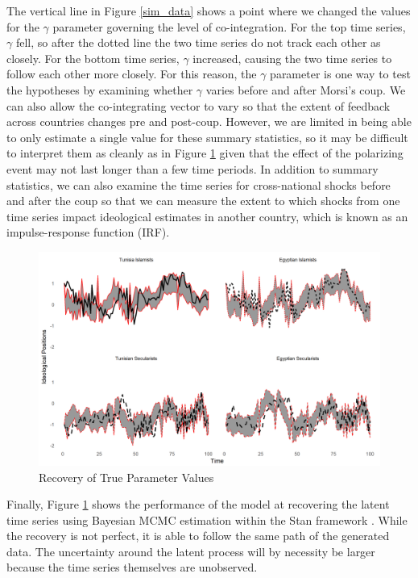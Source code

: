 \documentclass[12pt]{article}
\begin{document}
The vertical line in Figure \ref{sim_data} shows a point where we changed the values for the $\gamma$ parameter governing the level of co-integration. For the top time series, $\gamma$ fell, so after the dotted line the two time series do not track each other as closely. For the bottom time series, $\gamma$ increased, causing the two time series to follow each other more closely. For this reason, the $\gamma$ parameter is one way to test the hypotheses by examining whether $\gamma$ varies before and after Morsi's coup. We can also allow the co-integrating vector to vary so that the extent of feedback across countries changes pre and post-coup. However, we are limited in being able to only estimate a single value for these summary statistics, so it may be difficult to interpret them as cleanly as in Figure \ref*{true_pars} given that the effect of the polarizing event may not last longer than a few time periods. In addition to summary statistics, we can also examine the time series for cross-national shocks before and after the coup so that we can measure the extent to which shocks from one time series impact ideological estimates in another country, which is known as an impulse-response function (IRF).
\begin{figure}[!h]
	\caption{Recovery of True Parameter Values}\label{true_pars}
	\centering
	\includegraphics[width=.9\linewidth]{true_estimated.png}
\end{figure}

Finally, Figure \ref{true_pars} shows the performance of the model at recovering the latent time series using Bayesian MCMC estimation within the Stan framework \parencite{carpenter2017}. While the recovery is not perfect, it is able to follow the same path of the generated data. The uncertainty around the latent process will by necessity be larger because the time series themselves are unobserved.
\end{document}
